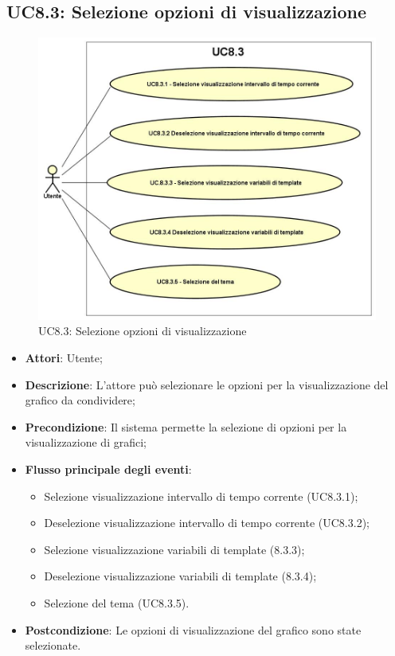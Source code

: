 \subsection{UC8.3: Selezione opzioni di visualizzazione}
\begin{figure} [H]
	\centering
	\includegraphics[scale=0.45]{Img/UC8-3}
	\caption{UC8.3: Selezione opzioni di visualizzazione}\label{}
\end{figure}
\begin{itemize}
	\item \textbf{Attori}: Utente;
	\item \textbf{Descrizione}: L'attore può selezionare le opzioni per la visualizzazione del grafico da condividere;
	\item \textbf{Precondizione}: Il sistema permette la selezione di opzioni per la visualizzazione di grafici;
	\item \textbf{Flusso principale degli eventi}:
	\begin{itemize}
		\item Selezione visualizzazione intervallo di tempo corrente (UC8.3.1);
		\item Deselezione visualizzazione intervallo di tempo corrente (UC8.3.2);
		\item Selezione visualizzazione variabili di template (8.3.3);
		\item Deselezione visualizzazione variabili di template (8.3.4);
		\item Selezione del tema (UC8.3.5).
	\end{itemize}
	\item \textbf{Postcondizione}: Le opzioni di visualizzazione del grafico sono state selezionate.
\end{itemize}

